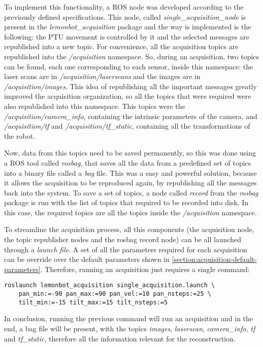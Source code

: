 To implement this functionality, a ROS node was developed according to the previously defined specifications. This node, called \emph{single\_acquisition\_node} is present in the \emph{lemonbot\_acquisition} package and the way is implemented is the following: the PTU movement is controlled by it and the selected messages are republished into a new topic. For convenience, all the acquisition topics are republished into the \emph{/acquisition} namespace. So, during an acquisition, two topics can be found, each one corresponding to each sensor, inside this namespace: the laser scans are in \emph{/acquisition/laserscans} and the images are in \emph{/acquisition/images}. This idea of republishing all the important messages greatly improved the acquisition organization, so all the topics that were required were also republished into this namespace. This topics were the \emph{/acquisition/camera\_info}, containing the intrinsic parameters of the camera, and \emph{/acquisition/tf} and \emph{/acquisition/tf\_static}, containing all the transformations of the robot.

Now, data from this topics need to be saved permanently, so this was done using a ROS tool called \emph{rosbag}, that saves all the data from a predefined set of topics into a binary file called a \emph{bag} file. This was a easy and powerful solution, because it allows the acquisition to be reproduced again, by republishing all the messages back into the system. To save a set of topics, a node called \emph{record} from the \emph{rosbag} package is run with the list of topics that required to be recorded into disk. In this case, the required topics are all the topics inside the \emph{/acquisition} namespace.

To streamline the acquisition process, all this components (the acquisition node, the topic republisher nodes and the rosbag record node) can be all launched through a \emph{launch file}. A set of all the parameters required for each acquisition can be override over the default parameters shown in \cref{section:acquisition-default-parameters}. Therefore, running an acquisition just requires a single command:

\begin{verbatim}
roslaunch lemonbot_acquisition single_acquisition.launch \
    pan_min:=-90 pan_max:=90 pan_vel:=10 pan_nsteps:=25 \
    tilt_min:=-15 tilt_max:=15 tilt_nsteps:=5
\end{verbatim}

In conclusion, running the previous command will run an acquisition and in the end, a bag file will be present, with the topics \emph{images}, \emph{laserscan}, \emph{camera\_info}, \emph{tf} and \emph{tf\_static}, therefore all the information relevant for the reconstruction.

